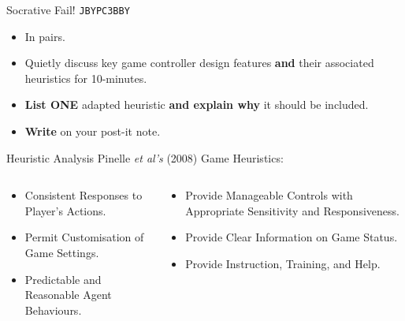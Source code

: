 \begin{frame}[fragile]{Socrative Fail! \texttt{JBYPC3BBY}}
	\begin{itemize}
		\item In pairs.
		\item Quietly discuss key game controller design features \textbf{and} their associated heuristics for 10-minutes.
		\item \textbf{List ONE} adapted heuristic \textbf{and explain why} it should be included.
		\item \textbf{Write} on your post-it note.
	\end{itemize}
\end{frame}

\begin{frame}{Heuristic Analysis}
Pinelle \textit{et al's} (2008) Game Heuristics:

	\begin{columns}[onlytextwidth]
		\begin{column}{0.45\textwidth}
			\begin{itemize}
				\item Consistent Responses to Player's Actions.
				\item Permit Customisation of Game Settings.
				\item Predictable and Reasonable Agent Behaviours.
			\end{itemize}
		\end{column}
		\begin{column}{0.45\textwidth}				
			\begin{itemize}
				\item Provide Manageable Controls with Appropriate Sensitivity and Responsiveness.
				\item Provide Clear Information on Game Status.
				\item Provide Instruction, Training, and Help.
			\end{itemize}
		\end{column}
	\end{columns}
\end{frame}

